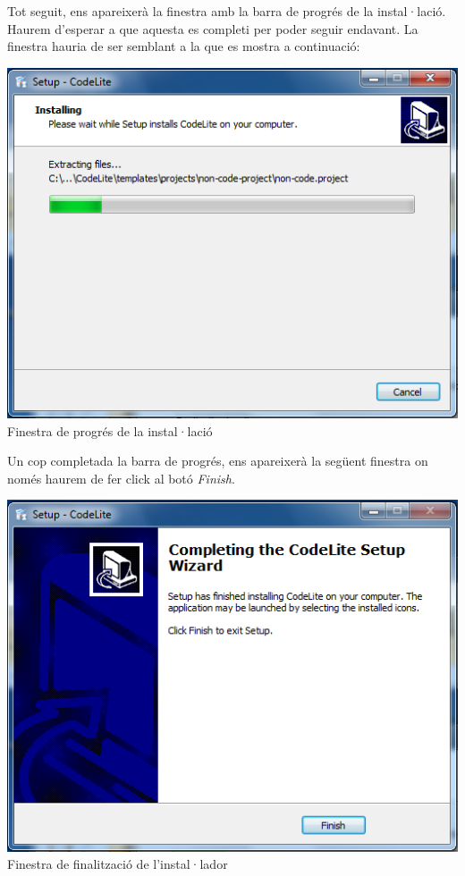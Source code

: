 \documentclass[11pt]{article}
\begin{document}
\noindent Tot seguit, ens apareixerà la finestra amb la barra de progrés de la instal·lació. Haurem d'esperar a que aquesta es completi per poder seguir endavant. La finestra hauria de ser semblant a la que es mostra a continuació:

\begin{center}
\includegraphics[scale=0.5]{img/Installer_10.png}\\
\small{Finestra de progrés de la instal·lació}
\end{center}

\noindent Un cop completada la barra de progrés, ens apareixerà la següent finestra on només haurem de fer click al botó \textit{Finish}.

\begin{center}
\includegraphics[scale=0.5]{img/Installer_11.png}\\
\small{Finestra de finalització de l'instal·lador}
\end{center}
\end{document}
